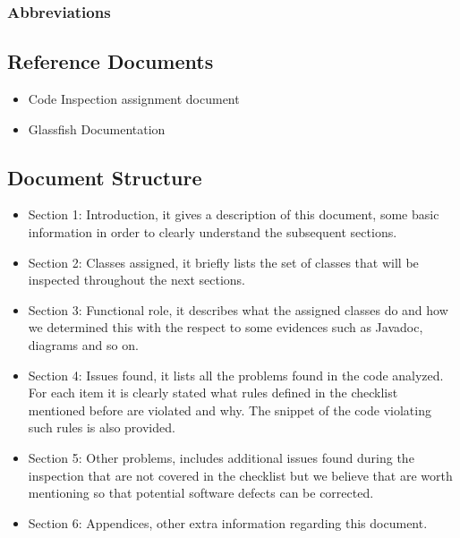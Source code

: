 \subsubsection{Abbreviations}
\subsection{Reference Documents}
\begin{itemize}
	\item Code Inspection assignment document
	\item Glassfish Documentation
\end{itemize}
\subsection{Document Structure}
\begin{itemize}
	\item Section 1: Introduction, it gives a description of this document, some basic information in order to clearly understand the subsequent sections.
	\item Section 2: Classes assigned, it briefly lists the set of classes that will be inspected throughout the next sections.
	\item Section 3: Functional role, it describes what the assigned classes do and how we determined this with the respect to some evidences such as Javadoc, diagrams and so on.
	\item Section 4: Issues found, it lists all the problems found in the code analyzed. For each item it is clearly stated what rules defined in the checklist mentioned before are violated and why. The snippet of the code violating such rules is also provided.
	\item Section 5: Other problems, includes additional issues found during the inspection that are not covered in the checklist but we believe that are worth mentioning so that potential software defects can be corrected.
	\item Section 6: Appendices, other extra information regarding this document. 
\end{itemize}
